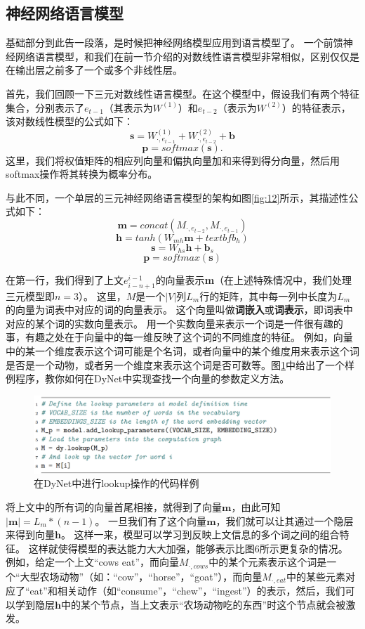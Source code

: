 \documentclass[10pt,a4paper]{ctexart}
\begin{document}
\subsection{神经网络语言模型}
基础部分到此告一段落，是时候把神经网络模型应用到语言模型\cite{nakamura1990neural,bengio2003neural}了。
一个前馈神经网络语言模型，和我们在前一节介绍的对数线性语言模型非常相似，区别仅仅是在输出层之前多了一个或多个非线性层。

首先，我们回顾一下三元对数线性语言模型。在这个模型中，假设我们有两个特征集合，分别表示了$e_{t-1}$（其表示为$W^{(1)}$）和$e_{t-2}$（表示为$W^{(2)}$）的特征表示，该对数线性模型的公式如下：
\[
 \textbf{s} = W_{\cdot,e_{t-1}}^{(1)} + W_{\cdot,e_{t-2}}^{(2)} + \textbf{b}
\]
\[
 \textbf{p} = softmax( \textbf{s} ).
\]
这里，我们将权值矩阵的相应列向量和偏执向量加和来得到得分向量，然后用softmax操作将其转换为概率分布。

与此不同，一个单层的三元神经网络语言模型的架构如图\ref{fig:12}所示，其描述性公式如下：
\[
 \textbf{m} = concat(M_{\cdot,e_{t-2}},M_{\cdot,e_{t-1}})
\]
\[
 \textbf{h} = tanh( W_{mh}\textbf{m} + textbf{b}_h)
\]
\[
 \textbf{s} = W_{hs}\textbf{h} + \textbf{b}_s
\]
\[
 \textbf{p} = softmax(\textbf{s})
\]

在第一行，我们得到了上文$e_{i-n+1}^{i-1}$的向量表示\textbf{m}（在上述特殊情况中，我们处理三元模型即$n=3$）。
这里，$M$是一个$|V|$列$L_m$行的矩阵，其中每一列中长度为$L_m$的向量为词表中对应的词的向量表示。
这个向量叫做\textbf{词嵌入}或\textbf{词表示}，即词表中对应的某个词的实数向量表示。
用一个实数向量来表示一个词是一件很有趣的事，有趣之处在于向量中的每一维反映了这个词的不同维度的特征。
例如，向量中的某一个维度表示这个词可能是个名词，或者向量中的某个维度用来表示这个词是否是一个动物，或者另一个维度来表示这个词是否可数等。图\ref{fig:13}中给出了一个样例程序，教你如何在DyNet中实现查找一个向量的参数定义方法。

\begin{figure}[H]
\centering
\includegraphics[width=1\textwidth]{fig13.png}
\caption{在DyNet中进行lookup操作的代码样例}
\label{fig:13}
\end{figure}

将上文中的所有词的向量首尾相接，就得到了向量$\textbf{m}$，由此可知$|\textbf{m}|=L_m * (n-1)$。
一旦我们有了这个向量$\textbf{m}$，我们就可以让其通过一个隐层来得到向量$\textbf{h}$。
这样一来，模型可以学习到反映上文信息的多个词之间的组合特征。
这样就使得模型的表达能力大大加强，能够表示比图6所示更复杂的情况。
例如，给定一个上文“cows eat”，而向量$M_{\cdot,cows}$中的某个元素表示这个词是一个“大型农场动物”（如：“cow”，“horse”，“goat”），而向量$M_{\cdot,eat}$中的某些元素对应了“eat”和相关动作（如“consume”，“chew”，“ingest”）的表示，然后，我们可以学到隐层$\textbf{h}$中的某个节点，当上文表示“农场动物吃的东西”时这个节点就会被激发。
\end{document}
